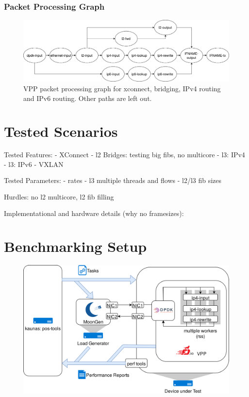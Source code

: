 \begin{frame}
    \frametitle{Packet Processing Graph}
    \begin{figure}
    \noindent\hspace{1mm}\includegraphics[width=\linewidth]{pics/vpp-nodes-horizontal.png}
    \caption{VPP packet processing graph for xconnect, bridging, IPv4 routing and IPv6 routing. Other paths are left out. }
    \label{nodegraph}
    \end{figure}
\end{frame}

\section{Tested Scenarios}

\begin{frame}
    Tested Features:
    - XConnect
    - l2 Bridges: testing big fibs, no multicore
    - l3: IPv4
    - l3: IPv6
    - VXLAN

    Tested Parameters: 
    - rates
    - l3 multiple threads and flows
    - l2/l3 fib sizes

    Hurdles: no l2 multicore, l2 fib filling

    Implementational and hardware details (why no framesizes): \cite{mywork}

\end{frame}

\section{Benchmarking Setup}

\begin{frame}
    \begin{figure}
    \noindent\hspace{1mm}\includegraphics[width=\linewidth]{pics/topology.png}
    \label{setup}
    \end{figure}
\end{frame}


